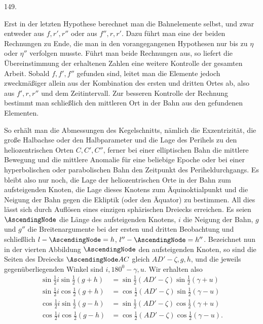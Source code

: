 \par{}\medskip
\begin{center}\hypertarget{native-199-article149}{}149.\end{center}
Erst in der letzten Hypothese berechnet man die Bahnelemente selbst, und zwar entweder aus $f,r',r''$ oder aus $f'',r,r'$. Dazu führt man eine der beiden Rechnungen zu Ende, die man in den vorangegangenen Hypothesen nur bis zu $\eta$ oder $\eta''$ verfolgen musste. Führt man beide Rechnungen aus, so liefert die Übereinstimmung der erhaltenen Zahlen eine weitere Kontrolle der gesamten Arbeit. Sobald $f,f',f''$ gefunden sind, leitet man die Elemente jedoch zweckmäßiger allein aus der Kombination des ersten und dritten Ortes ab, also aus $f',r,r''$ und dem Zeitintervall. Zur besseren Kontrolle der Rechnung bestimmt man schließlich den mittleren Ort in der Bahn aus den gefundenen Elementen.

So erhält man die Abmessungen des Kegelschnitts, nämlich die Exzentrizität, die große Halbachse oder den Halbparameter und die Lage des Perihels zu den heliozentrischen Orten $C,C',C''$, ferner bei einer elliptischen Bahn die mittlere Bewegung und die mittlere Anomalie für eine beliebige Epoche oder bei einer hyperbolischen oder parabolischen Bahn den Zeitpunkt des Periheldurchgangs. Es bleibt also nur noch, die Lage der heliozentrischen Orte in der Bahn zum aufsteigenden Knoten, die Lage dieses Knotens zum Äquinoktialpunkt und die Neigung der Bahn gegen die Ekliptik (oder den Äquator) zu bestimmen. All dies lässt sich durch Auflösen eines einzigen sphärischen Dreiecks erreichen. Es seien $\AscendingNode$ die Länge des aufsteigenden Knotens, $i$ die Neigung der Bahn, $g$ und $g''$ die Breitenargumente bei der ersten und dritten Beobachtung und schließlich $l-\AscendingNode=h$, $l''-\AscendingNode=h''$. Bezeichnet nun in der vierten Abbildung $\AscendingNode$ den aufsteigenden Knoten, so sind die Seiten des Dreiecks $\AscendingNode AC$ gleich $AD'-\zeta,g,h$, und die jeweils gegenüberliegenden Winkel sind $i,180^{0}-\gamma,u$.
Wir erhalten also
\[
\begin{aligned}
\sin\tfrac12i\sin\tfrac12(g+h)&=\sin\tfrac12(AD'-\zeta)\sin\tfrac12(\gamma+u)\\
\sin\tfrac12i\cos\tfrac12(g+h)&=\cos\tfrac12(AD'-\zeta)\sin\tfrac12(\gamma-u)\\
\cos\tfrac12i\sin\tfrac12(g-h)&=\sin\tfrac12(AD'-\zeta)\cos\tfrac12(\gamma+u)\\
\cos\tfrac12i\cos\tfrac12(g-h)&=\cos\tfrac12(AD'-\zeta)\cos\tfrac12(\gamma-u).
\end{aligned}
\]

